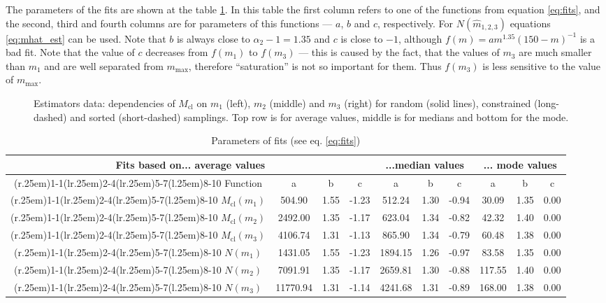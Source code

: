 \documentclass{aastex}
\newcommand{\Mmax}{m_{\mathrm{max}}}
\newcommand{\Mcl}{M_{\mathrm{cl}}}
\newcommand{\includeEPS}[2]{\scalebox{#2}{\texttt{[image: ./images/bw/\#1]}}}
\newcommand{\customrule}{\cmidrule(r{.25em}){1-1}\cmidrule(lr{.25em}){2-4}\cmidrule(lr{.25em}){5-7}\cmidrule(l{.25em}){8-10}}
\begin{document}
The parameters of the fits are shown at the table \ref{tbl:fits}. In this table the first column refers to one of the functions from equation  \ref{eq:fits}, and the second, third and fourth columns are for parameters of this functions --- $a$, $b$ and $c$, respectively.
For $N(\hat{m}_{1,2,3})$ equations \ref{eq:mhat_est} can be used. Note that $b$ is always close to $\alpha_2 - 1 = 1.35$ and $c$ is close to $-1$, although $f(m) = a m^{1.35} (150-m)^{-1}$ is a bad fit. Note that the value of $c$ decreases from $f(m_1)$ to $f(m_3)$ --- this is caused by the fact, that the values of $m_3$ are much smaller than $m_1$ and are well separated from $\Mmax$, therefore ``saturation'' is not so important for them. Thus $f(m_3)$ is less sensitive to the value of $\Mmax$.
\begin{figure}
  \begin{center}
    \hspace{-2.4cm}
    \includeEPS{all_estimators.eps}{0.45}
  \end{center}
  \caption{Estimators data: dependencies of $\Mcl$ on $m_1$ (left), $m_2$ (middle) and $m_3$ (right) for random (solid lines), constrained (long-dashed) and sorted (short-dashed) samplings. Top row is for average values, middle is for medians and bottom for the mode.}\label{fig:median1}
\end{figure}

\begin{table}
\begin{center}
\caption{Parameters of fits (see eq. \ref{eq:fits})}\label{tbl:fits}
\begin{tabular}{cccccccccc} \\ \toprule
   \multicolumn{4}{c}{Fits based on... average values} 
 & \multicolumn{3}{c}{...median values}
 & \multicolumn{3}{c}{... mode values} 
 \\ \customrule
Function    &        a &   b  &     c &       a &    b &     c &      a &   b  &  c \footnotemark[1]   \\ \customrule
$\Mcl(m_1)$ &   504.90 & 1.55 & -1.23 &  512.24 & 1.30 & -0.94 &  30.09 & 1.35 & 0.00  \\ \customrule
$\Mcl(m_2)$ &  2492.00 & 1.35 & -1.17 &  623.04 & 1.34 & -0.82 &  42.32 & 1.40 & 0.00  \\ \customrule
$\Mcl(m_3)$ &  4106.74 & 1.31 & -1.13 &  865.90 & 1.34 & -0.79 &  60.48 & 1.38 & 0.00  \\ \customrule
$N(m_1)$    &  1431.05 & 1.55 & -1.23 & 1894.15 & 1.26 & -0.97 &  83.58 & 1.35 & 0.00  \\ \customrule
$N(m_2)$    &  7091.91 & 1.35 & -1.17 & 2659.81 & 1.30 & -0.88 & 117.55 & 1.40 & 0.00  \\ \customrule
$N(m_3)$    & 11770.94 & 1.31 & -1.14 & 4241.68 & 1.31 & -0.89 & 168.00 & 1.38 & 0.00  \\ \bottomrule
\end{tabular}
\end{center}
\end{table}
\end{document}
